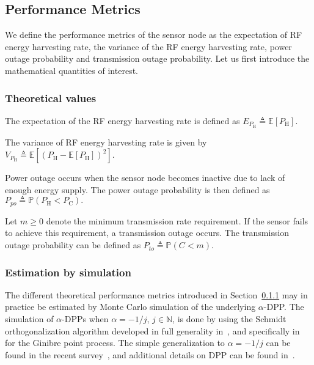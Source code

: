\documentclass[12pt,draftclsnofoot,onecolumn]{IEEEtran}
\begin{document}
\subsection{Performance Metrics}
\label{sec:metrics}

We define the performance metrics of the sensor node as the expectation of RF energy harvesting rate, the variance of the RF energy harvesting rate, power outage probability and transmission outage probability. Let us first introduce the mathematical quantities of interest.

\subsubsection{Theoretical values}
\label{subsec:theoretical}
The expectation of the RF energy harvesting rate is defined as $
E_{P_{\mathrm H}} \triangleq \mathbb{E} \left[ P_{\mathrm{H}} \right].
$


The variance of RF energy harvesting rate is given by $
V_{P_{\mathrm H}} \triangleq\mathbb E\left[\left(P_{\mathrm{H}}-\mathbb{E} \left[ P_{\mathrm{H}} \right]\right)^2\right]. 
$




Power outage occurs when the sensor node becomes inactive due to lack of enough energy supply. The power outage probability is then defined as $
	P_{po}	\triangleq	\mathbb{P} \left(	 P_{\mathrm{H}}	<	P_{\mathrm{C}}	\right). 
$


Let $m \ge 0$ denote the minimum transmission rate requirement. If the sensor fails to achieve this requirement, a transmission outage occurs. The transmission outage probability can be defined as $
	P_{to} \triangleq	\mathbb{P} \left(	C	<	m	\right). 
$




\subsubsection{Estimation by simulation}

The different theoretical performance metrics introduced in Section~\ref{subsec:theoretical} may in practice be estimated by Monte Carlo simulation of the underlying $\alpha$-DPP. The simulation of $\alpha$-DPPs when $\alpha=-1/j$, $j\in\mathbb N $, is done by using the Schmidt orthogonalization algorithm developed in full generality in~\cite{Hough}, and specifically in~\cite{DecreusefondFlintVergne} for the Ginibre point process. The simple generalization to $\alpha=-1/j$ can be found in the recent survey~\cite{DecreusefondFlintPrivaultTorrisi}, and additional details on DPP can be found in~\cite{DecreusefondFlintPrivaultTorrisi2}. 
\end{document}
